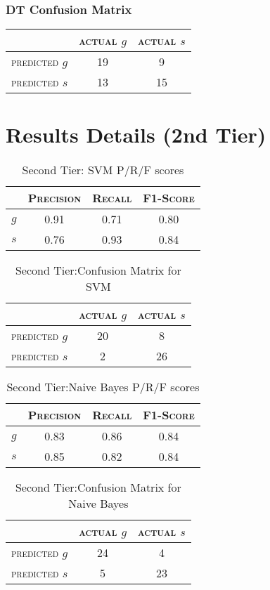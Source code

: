 \begin{multicols}{2}
\subsection{DT Confusion Matrix}
\begin{tabular}{ c | c  c }
	 & \textsc{actual $g$} & \textsc{actual $s$} \\
	\hline
	\textsc{predicted $g$} 	& 19 & 9 \\
	\textsc{predicted $s$}		& 13 & 15
\end{tabular}

\end{multicols}


\chapter{Results Details (2nd Tier)}

\begin{table}[h]
	\center
	\begin{tabular}{ c | c  c  c }
		& \textsc{Precision} & \textsc{Recall} & \textsc{F1-Score} \\
		\hline
		\textsc{$g$} 	& 0.91 & 0.71 & 0.80 \\
		\textsc{$s$}	& 0.76 & 0.93 & 0.84
	\end{tabular}
	\caption{Second Tier: SVM P/R/F scores}
\end{table}

\begin{table}[h]
	\center
	\begin{tabular}{ c | c  c }
		 & \textsc{actual $g$} & \textsc{actual $s$} \\
		\hline
		\textsc{predicted $g$} 	& 20 & 8 \\
		\textsc{predicted $s$}		& 2 & 26
	\end{tabular}
	\caption{Second Tier:Confusion Matrix for SVM}
\end{table}

\begin{table}[h]
	\center
	\begin{tabular}{ c | c  c  c }
		& \textsc{Precision} & \textsc{Recall} & \textsc{F1-Score} \\
		\hline
		\textsc{$g$} 	& 0.83 & 0.86 & 0.84 \\
		\textsc{$s$}	& 0.85 & 0.82 & 0.84
	\end{tabular}
	\caption{Second Tier:Naive Bayes P/R/F scores}
\end{table}

\begin{table}[h]
	\center
	\begin{tabular}{ c | c  c }
		 & \textsc{actual $g$} & \textsc{actual $s$} \\
		\hline
		\textsc{predicted $g$} 	& 24 & 4 \\
		\textsc{predicted $s$}		& 5 & 23
	\end{tabular}
	\caption{Second Tier:Confusion Matrix for Naive Bayes}
\end{table}

